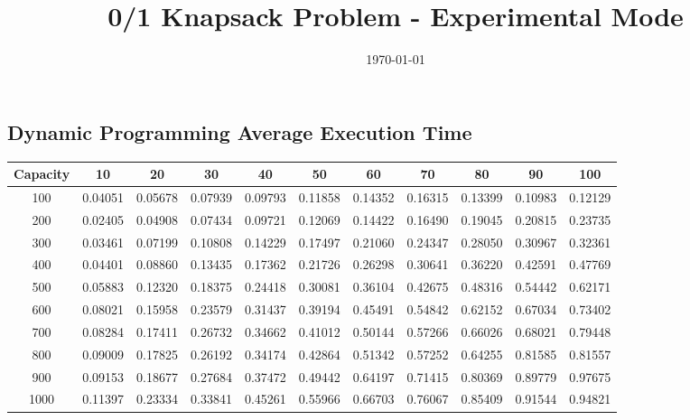 \documentclass{article}
\title{0/1 Knapsack Problem - Experimental Mode}
\date{\today}
\begin{document}
\maketitle

\subsection{Dynamic Programming Average Execution Time}
\begin{center}
\begin{tabular}{ccccccccccc}
\toprule
Capacity & 10 & 20 & 30 & 40 & 50 & 60 & 70 & 80 & 90 & 100 \\
\midrule
100 & 0.04051 & 0.05678 & 0.07939 & 0.09793 & 0.11858 & 0.14352 & 0.16315 & 0.13399 & 0.10983 & 0.12129 \\
200 & 0.02405 & 0.04908 & 0.07434 & 0.09721 & 0.12069 & 0.14422 & 0.16490 & 0.19045 & 0.20815 & 0.23735 \\
300 & 0.03461 & 0.07199 & 0.10808 & 0.14229 & 0.17497 & 0.21060 & 0.24347 & 0.28050 & 0.30967 & 0.32361 \\
400 & 0.04401 & 0.08860 & 0.13435 & 0.17362 & 0.21726 & 0.26298 & 0.30641 & 0.36220 & 0.42591 & 0.47769 \\
500 & 0.05883 & 0.12320 & 0.18375 & 0.24418 & 0.30081 & 0.36104 & 0.42675 & 0.48316 & 0.54442 & 0.62171 \\
600 & 0.08021 & 0.15958 & 0.23579 & 0.31437 & 0.39194 & 0.45491 & 0.54842 & 0.62152 & 0.67034 & 0.73402 \\
700 & 0.08284 & 0.17411 & 0.26732 & 0.34662 & 0.41012 & 0.50144 & 0.57266 & 0.66026 & 0.68021 & 0.79448 \\
800 & 0.09009 & 0.17825 & 0.26192 & 0.34174 & 0.42864 & 0.51342 & 0.57252 & 0.64255 & 0.81585 & 0.81557 \\
900 & 0.09153 & 0.18677 & 0.27684 & 0.37472 & 0.49442 & 0.64197 & 0.71415 & 0.80369 & 0.89779 & 0.97675 \\
1000 & 0.11397 & 0.23334 & 0.33841 & 0.45261 & 0.55966 & 0.66703 & 0.76067 & 0.85409 & 0.91544 & 0.94821 \\
\bottomrule
\end{tabular}
\end{center}
\end{document}
